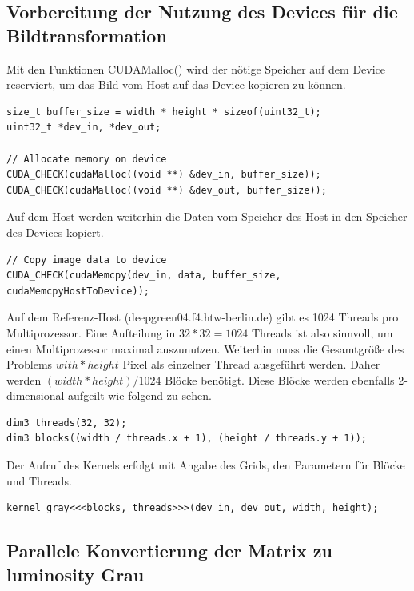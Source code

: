 \documentclass{llncs}
\begin{document}
\subsection{Vorbereitung der Nutzung des Devices für die Bildtransformation}
%

Mit den Funktionen CUDAMalloc() wird der nötige Speicher auf dem Device reserviert, um das Bild vom Host auf das Device kopieren zu können.

\begin{lstlisting}
size_t buffer_size = width * height * sizeof(uint32_t);
uint32_t *dev_in, *dev_out;

// Allocate memory on device
CUDA_CHECK(cudaMalloc((void **) &dev_in, buffer_size));
CUDA_CHECK(cudaMalloc((void **) &dev_out, buffer_size));
\end{lstlisting}

Auf dem Host werden weiterhin die Daten vom Speicher des Host in den Speicher des Devices kopiert.\\

\begin{lstlisting}[]
// Copy image data to device
CUDA_CHECK(cudaMemcpy(dev_in, data, buffer_size, cudaMemcpyHostToDevice));
\end{lstlisting}

Auf dem Referenz-Host (deepgreen04.f4.htw-berlin.de) gibt es 1024 Threads pro Multiprozessor. Eine Aufteilung in $32 * 32 = 1024$ Threads ist also sinnvoll, um einen Multiprozessor maximal auszunutzen. Weiterhin muss die Gesamtgröße des Problems $with * height$ Pixel als einzelner Thread ausgeführt werden. Daher werden $(width * height) / 1024$ Blöcke benötigt. Diese Blöcke werden ebenfalls 2-dimensional aufgeilt wie folgend zu sehen.

\begin{lstlisting}
dim3 threads(32, 32);
dim3 blocks((width / threads.x + 1), (height / threads.y + 1));
\end{lstlisting}

Der Aufruf des Kernels erfolgt mit Angabe des Grids, den Parametern für Blöcke und Threads.

\begin{lstlisting}
kernel_gray<<<blocks, threads>>>(dev_in, dev_out, width, height);
\end{lstlisting}


%
\subsection{Parallele Konvertierung der Matrix zu luminosity Grau}
%
\end{document}
